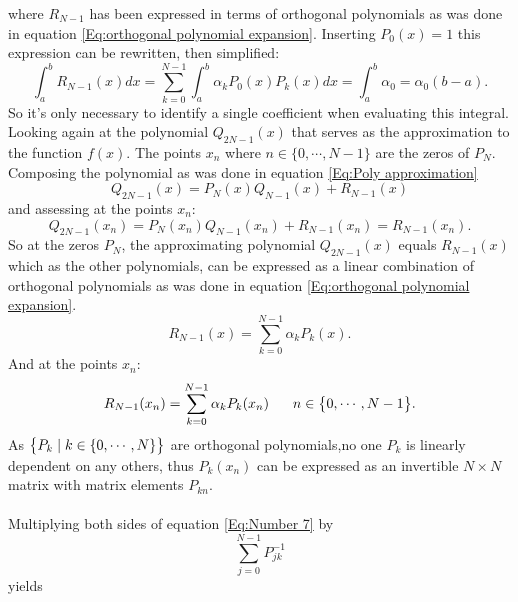 \documentclass[10pt,a4paper]{article}
\begin{document}
where $R_{N-1}$ has been expressed in terms of orthogonal polynomials as was done in equation \ref{Eq:orthogonal polynomial expansion}.
Inserting $P_0(x) = 1$ this expression can be rewritten, then simplified:
\begin{equation}\label{Eq: integral as a function of a0}
\int_{a}^bR_{N-1}(x)dx = \sum\limits_{k=0}^{N-1}  \int_{a}^b \alpha_kP_0(x) P_k(x)dx = \int_{a}^b \alpha_0 = \alpha_0(b-a).
\end{equation}
So it's only necessary to identify a single coefficient when evaluating this integral.\\Looking again at the polynomial $Q_{2N-1}(x)$ that serves as the approximation to the function $f(x)$. The points $x_n$ where $n \in \big\{0,\cdots,N-1\big\}$ are the zeros of $P_N$. Composing the polynomial as was done in equation \ref{Eq:Poly approximation}
\begin{equation*}
Q_{2N-1}(x) = P_N(x)Q_{N-1}(x)+R_{N-1}(x)
\end{equation*}
and assessing at the points $x_n$:
\begin{equation}\label{Eq:Q2n_1 and Rn_1}
Q_{2N-1}(x_n) = P_N(x_n)Q_{N-1}(x_n)+R_{N-1}(x_n) = R_{N-1}(x_n).
\end{equation}
So at the zeros $P_N$, the approximating polynomial $Q_{2N-1}(x)$ equals $R_{N-1}(x)$ which as the other polynomials, can be expressed as a linear combination of orthogonal polynomials as was done in equation \ref{Eq:orthogonal polynomial expansion}.
\begin{equation*}
R_{N-1}(x) = \sum\limits_{k=0}^{N-1} \alpha_k P_k(x).
\end{equation*} 
And at the points $x_n$:
\begin{equation}\label{Eq:Number 7}
R_{N-1}(x_n) = \sum\limits_{k=0}^{N-1} \alpha_k P_k(x_n)\hspace{6mm}n \in \big\{0,\cdots,N-1\big\}.
\end{equation}
As $\big\{ P_k\hspace{1mm}|\hspace{1mm} k \in \{0,\cdots,N\} \big\}$ are orthogonal polynomials,no one $P_k$ is linearly dependent on any others, thus $P_k(x_n)$ can be expressed as an invertible $N\times N$ matrix with matrix elements $P_{kn}$.\\\\Multiplying both sides of equation \ref{Eq:Number 7} by 
\begin{equation}
\sum\limits_{j=0}^{N-1}P_{jk}^{-1}
\end{equation}
yields
\end{document}
